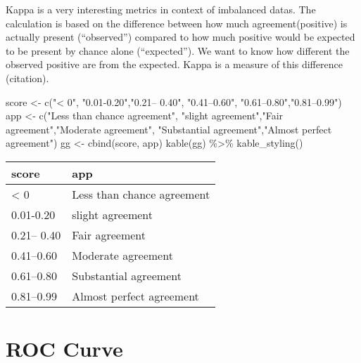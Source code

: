 \documentclass[
]{report}
\newenvironment{Shaded}{\begin{snugshade}}{\end{snugshade}}
\newcommand{\FunctionTok}[1]{\textcolor[rgb]{0.00,0.00,0.00}{#1}}
\newcommand{\NormalTok}[1]{#1}
\newcommand{\OtherTok}[1]{\textcolor[rgb]{0.56,0.35,0.01}{#1}}
\newcommand{\SpecialCharTok}[1]{\textcolor[rgb]{0.00,0.00,0.00}{#1}}
\newcommand{\StringTok}[1]{\textcolor[rgb]{0.31,0.60,0.02}{#1}}
\begin{document}
Kappa is a very interesting metrics in context of imbalanced datas.
The calculation is based on the difference between how much agreement(positive) is actually present (``observed'') compared to how much positive would be expected to be present by chance alone (``expected''). We want to know how different the observed positive are from the expected. Kappa is a measure of this difference (citation).

\begin{Shaded}
\begin{Highlighting}[]
\NormalTok{score }\OtherTok{\textless{}{-}} \FunctionTok{c}\NormalTok{(}\StringTok{"\textless{} 0"}\NormalTok{, }\StringTok{"0.01{-}0.20"}\NormalTok{,}\StringTok{"0.21– 0.40"}\NormalTok{, }\StringTok{"0.41–0.60"}\NormalTok{, }\StringTok{"0.61–0.80"}\NormalTok{,}\StringTok{"0.81–0.99"}\NormalTok{)}
\NormalTok{app }\OtherTok{\textless{}{-}} \FunctionTok{c}\NormalTok{(}\StringTok{"Less than chance agreement"}\NormalTok{, }\StringTok{"slight agreement"}\NormalTok{,}\StringTok{"Fair agreement"}\NormalTok{,}\StringTok{"Moderate agreement"}\NormalTok{, }\StringTok{"Substantial agreement"}\NormalTok{,}\StringTok{"Almost perfect agreement"}\NormalTok{)}
\NormalTok{gg }\OtherTok{\textless{}{-}} \FunctionTok{cbind}\NormalTok{(score, app)}
\FunctionTok{kable}\NormalTok{(gg) }\SpecialCharTok{\%\textgreater{}\%} \FunctionTok{kable\_styling}\NormalTok{()}
\end{Highlighting}
\end{Shaded}

\begin{table}
\centering
\begin{tabular}{l|l}
\hline
score & app\\
\hline
< 0 & Less than chance agreement\\
\hline
0.01-0.20 & slight agreement\\
\hline
0.21– 0.40 & Fair agreement\\
\hline
0.41–0.60 & Moderate agreement\\
\hline
0.61–0.80 & Substantial agreement\\
\hline
0.81–0.99 & Almost perfect agreement\\
\hline
\end{tabular}
\end{table}

\hypertarget{roc-curve}{%
\section{ROC Curve}\label{roc-curve}}
\end{document}
